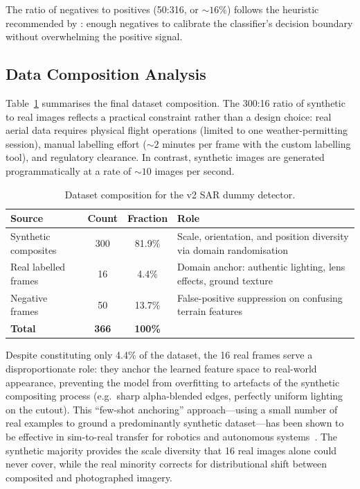 The ratio of negatives to positives (50:316, or ${\sim}16\%$) follows the heuristic recommended by \textcite{shrivastava2016training}: enough negatives to calibrate the classifier's decision boundary without overwhelming the positive signal.

\subsection{Data Composition Analysis}\label{sec:training:composition}

Table~\ref{tab:data_composition} summarises the final dataset composition. The 300:16 ratio of synthetic to real images reflects a practical constraint rather than a design choice: real aerial data requires physical flight operations (limited to one weather-permitting session), manual labelling effort (${\sim}2$ minutes per frame with the custom labelling tool), and regulatory clearance. In contrast, synthetic images are generated programmatically at a rate of ${\sim}10$ images per second.

\begin{table}[ht]
    \centering
    \caption{Dataset composition for the v2 SAR dummy detector.}
    \label{tab:data_composition}
    \begin{tabular}{@{}lccp{5.5cm}@{}}
        \toprule
        \textbf{Source} & \textbf{Count} & \textbf{Fraction} & \textbf{Role} \\
        \midrule
        Synthetic composites & 300 & 81.9\% & Scale, orientation, and position diversity via domain randomisation \\
        Real labelled frames & 16 & 4.4\% & Domain anchor: authentic lighting, lens effects, ground texture \\
        Negative frames & 50 & 13.7\% & False-positive suppression on confusing terrain features \\
        \midrule
        \textbf{Total} & \textbf{366} & \textbf{100\%} & \\
        \bottomrule
    \end{tabular}
\end{table}

Despite constituting only 4.4\% of the dataset, the 16 real frames serve a disproportionate role: they anchor the learned feature space to real-world appearance, preventing the model from overfitting to artefacts of the synthetic compositing process (e.g.\ sharp alpha-blended edges, perfectly uniform lighting on the cutout). This ``few-shot anchoring'' approach---using a small number of real examples to ground a predominantly synthetic dataset---has been shown to be effective in sim-to-real transfer for robotics and autonomous systems~\cite{domainrand}. The synthetic majority provides the scale diversity that 16 real images alone could never cover, while the real minority corrects for distributional shift between composited and photographed imagery.

